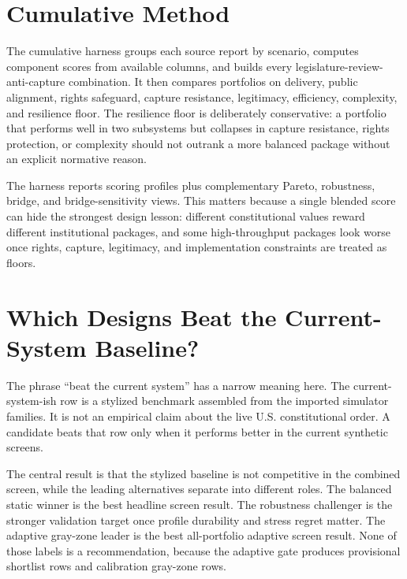 \documentclass[11pt]{article}
\providecommand{\GeneratedDir}{generated}
\begin{document}
\section{Cumulative Method}

The cumulative harness groups each source report by scenario, computes component scores from available columns, and builds every legislature-review-anti-capture combination. It then compares portfolios on delivery, public alignment, rights safeguard, capture resistance, legitimacy, efficiency, complexity, and resilience floor. The resilience floor is deliberately conservative: a portfolio that performs well in two subsystems but collapses in capture resistance, rights protection, or complexity should not outrank a more balanced package without an explicit normative reason.

The harness reports \ScoringProfileCount{} scoring profiles plus complementary Pareto, robustness, bridge, and bridge-sensitivity views. This matters because a single blended score can hide the strongest design lesson: different constitutional values reward different institutional packages, and some high-throughput packages look worse once rights, capture, legitimacy, and implementation constraints are treated as floors.

\section{Which Designs Beat the Current-System Baseline?}

The phrase ``beat the current system'' has a narrow meaning here. The current-system-ish row is a stylized benchmark assembled from the imported simulator families. It is not an empirical claim about the live U.S. constitutional order. A candidate beats that row only when it performs better in the current synthetic screens.



The central result is that the stylized baseline is not competitive in the combined screen, while the leading alternatives separate into different roles. The balanced static winner is the best headline screen result. The robustness challenger is the stronger validation target once profile durability and stress regret matter. The adaptive gray-zone leader is the best all-portfolio adaptive screen result. None of those labels is a recommendation, because the adaptive gate produces \AdaptiveProvisionalShortlistCount{} provisional shortlist rows and \AdaptiveCalibrationGrayZoneCount{} calibration gray-zone rows.
\end{document}
